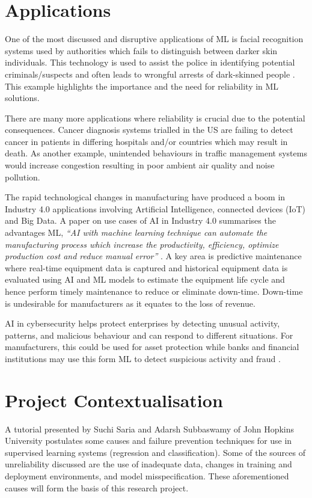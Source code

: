 \documentclass[a4paper,12pt]{report}
\begin{document}
\section{Applications}
One of the most discussed and disruptive applications of ML is facial 
recognition systems used by authorities which fails to distinguish 
between darker skin individuals. This technology is used to assist the 
police in identifying potential criminals/suspects and often leads to 
wrongful arrests of dark-skinned people \cite{Moutafis}. This example highlights the 
importance and the need for reliability in ML solutions. 

There are many more applications where reliability is crucial due to the 
potential consequences. Cancer diagnosis systems trialled in the US are 
failing to detect cancer in patients in differing hospitals and/or countries which may result 
in death. As another example, unintended behaviours in traffic management systems would 
increase congestion resulting in poor ambient air quality and noise 
pollution.

The rapid technological changes in manufacturing have produced a boom 
in Industry 4.0 applications involving Artificial Intelligence, connected
 devices (IoT) and Big Data. A paper on use cases of AI in Industry 4.0 
 summarises the advantages ML, \textit{“AI with machine learning technique can 
 automate the manufacturing process which increase the productivity, 
 efficiency, optimize production cost and reduce manual error” }\cite{9004327}. A 
 key area is predictive maintenance where real-time equipment data is 
 captured and historical equipment data is evaluated using AI and ML 
 models to estimate the equipment life cycle and hence perform timely 
 maintenance to reduce or eliminate down-time. Down-time is undesirable
for manufacturers as it equates to the loss of revenue.

AI in cybersecurity helps protect enterprises by detecting unusual 
activity, patterns, and malicious behaviour and can respond to different 
situations. For manufacturers, this could be used for asset protection 
while banks and financial institutions may use this form ML to detect suspicious 
activity and fraud \cite{9004327}. 

\section{Project Contextualisation}
A tutorial presented by Suchi Saria and Adarsh Subbaswamy of John Hopkins University \cite{saria2019tutorial} postulates some causes and failure prevention techniques for use in supervised learning systems (regression and classification). 
Some of the sources of unreliability discussed are the use of inadequate data, changes in training and deployment environments, and model misspecification. 
These aforementioned causes will form the basis of this research project.
\end{document}
